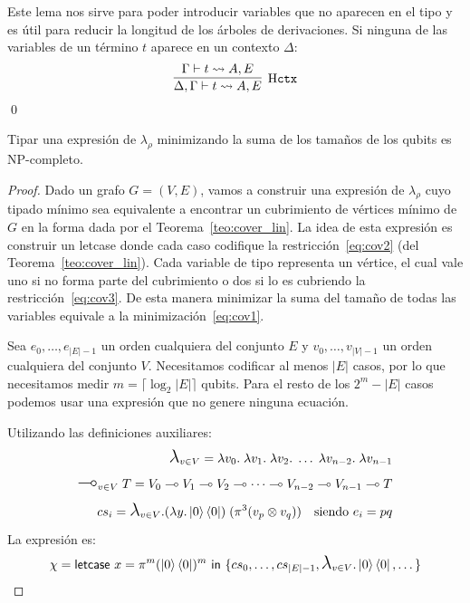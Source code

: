 \begin{lema}
    Este lema nos sirve para poder introducir variables que no aparecen en el tipo y es útil para reducir la longitud de los árboles de derivaciones. Si ninguna de las variables de un término $t$ aparece en un contexto $\Delta$: 
    \begin{equation*}
        \infer[\text{H}\mathtt{ctx}]
            {\Delta,\Gamma \vdash t \leadsto A,E}
            {\Gamma \vdash t\leadsto A,E}
    \end{equation*}\qed
\end{lema}
\begin{teorema}\label{teo:hindley_np}
    Tipar una expresión de $\lambda_\rho$ minimizando la suma de los tamaños de los qubits es NP-completo.
\end{teorema}
\begin{proof}
    Dado un grafo $G=(V,E)$, vamos a construir una expresión de $\lambda_\rho$ cuyo tipado mínimo sea equivalente a encontrar un cubrimiento de vértices mínimo de $G$ en la forma dada por el Teorema~\ref{teo:cover_lin}. La idea de esta expresión es construir un \textsf{letcase} donde cada caso codifique la restricción~\ref{eq:cov2} (del Teorema~\ref{teo:cover_lin}). Cada variable de tipo representa un vértice, el cual vale uno si no forma parte del cubrimiento o dos si lo es cubriendo la restricción~\ref{eq:cov3}. De esta manera minimizar la suma del tamaño de todas las variables equivale a la minimización~\ref{eq:cov1}.

    Sea $e_0, \dots, e_{|E|-1}$ un orden cualquiera del conjunto $E$ y $v_0, \dots, v_{|V|-1}$ un orden cualquiera del conjunto $V$. Necesitamos codificar al menos $|E|$ casos, por lo que necesitamos medir $m=\lceil\log_2|E|\rceil$ qubits. Para el resto de los $2^m-|E|$ casos podemos usar una expresión que no genere ninguna ecuación.

    Utilizando las definiciones auxiliares:
    \begin{align*}
        \biglambda_{v\in V}  =\lambda v_0.\;\lambda v_1.\;\lambda v_2.\; \dots \;\lambda v_{n-2}.\;\lambda v_{n-1}\\
        \bigmultimap_{v\in V}\;T = V_0\multimap V_1 \multimap V_2\multimap \dots\multimap V_{n-2}\multimap V_{n-1} \multimap T\\
        cs_i= \biglambda_{v\in V}.(\lambda y. \ket{0}\bra{0})\;(\pi^3 (v_p\otimes v_q)) \quad\text{siendo } e_i = pq
    \end{align*}
    La expresión es:
    \begin{align}\label{eq:chi}
        \chi = \textsf{letcase } x = \pi^m (\ket{0}\bra{0})^m\textsf{ in }\{cs_0, \dots, cs_{|E|-1}, \biglambda_{v\in V}.\ket{0}\bra{0}, \dots\}
    \end{align}


\end{proof}
